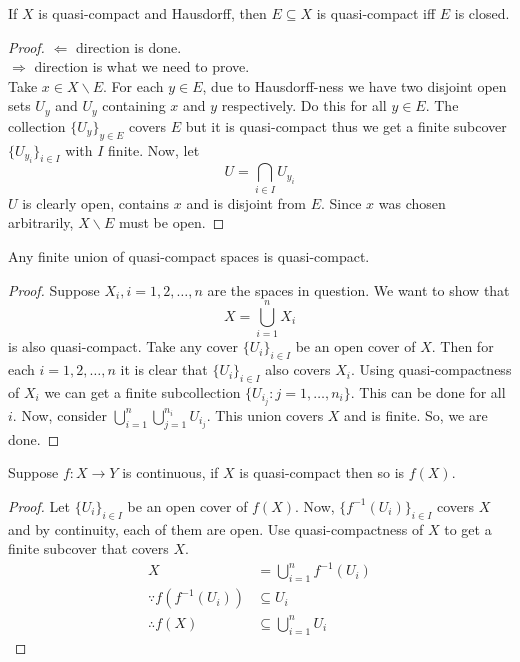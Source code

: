 \documentclass[oneside, 12pt, ]{scrbook}
\theoremstyle{theorem}
\begin{document}
\begin{proposition}
If $X$ is quasi-compact and Hausdorff, then $E \subseteq X$ is quasi-compact iff $E$ is closed.
\end{proposition}

\begin{proof}
$\Leftarrow$ direction is done. \\
$\Rightarrow$ direction is what we need to prove. \\
Take $x\in X \backslash E$. For each $y \in E$, due to Hausdorff-ness we have two disjoint open sets $U_{y}$ and $U_{y}$ containing $x$ and $y$ respectively. Do this for all $y \in E$. The collection $\{U_{y}\}_{y \in E}$ covers $E$ but it is quasi-compact thus we get a finite subcover $\{U_{y_{i}}\}_{i \in I}$ with $I$ finite. Now, let $$U = \bigcap_{i \in I} U_{y_{i}}$$ $U$ is clearly open, contains $x$ and is disjoint from $E$. Since $x$ was chosen arbitrarily, $X\backslash E$ must be open. 
\end{proof}

\begin{lemma}
Any finite union of quasi-compact spaces is quasi-compact.
\end{lemma}

\begin{proof}
Suppose $X_{i}, i =1,2,\hdots ,n$ are the spaces in question. We want to show that $$X = \bigcup_{i=1}^n X_{i}$$ is also quasi-compact. Take any cover $\{U_{i}\}_{i \in I}$  be an open cover of $X$. Then for each $i=1,2, \hdots , n$ it is clear that $\{U_{i}\}_{i \in I}$ also covers $X_{i}$. Using quasi-compactness of $X_{i}$ we can get a finite subcollection $\{U_{i_{j}}: j =1 , \hdots , n_{i}\}$. This can be done for all $i$. Now, consider $\bigcup_{i=1}^{n} \bigcup_{j=1}^{n_{i}} U_{i_{j}}$. This union covers $X$ and is finite. So, we are done. 
\end{proof}

\begin{lemma}
Suppose $f: X \rightarrow Y$ is continuous, if $X$ is quasi-compact then so is $f(X)$.
\end{lemma}

\begin{proof}
Let $\{U_{i}\}_{i \in I}$ be an open cover of $f(X)$. Now, $\{f^{-1}(U_{i})\}_{i \in I}$ covers $X$ and by continuity, each of them are open. Use quasi-compactness of $X$ to get a finite subcover that covers $X$.
\begin{align*}
X &= \bigcup_{i=1}^n f^{-1}(U_{i}) \\
\because f(f^{-1}(U_{i})) &\subseteq U_{i} \\
\therefore f(X) &\subseteq \bigcup_{i=1}^n U_{i} 
\end{align*}
\end{proof}
\end{document}
